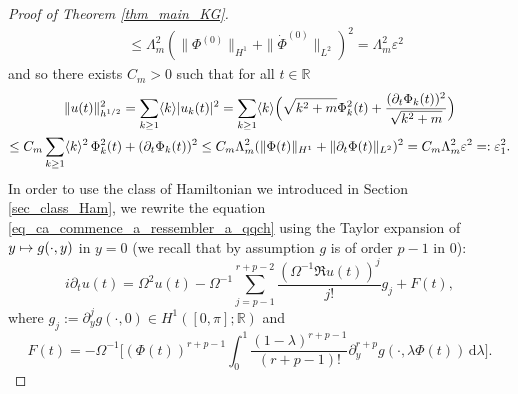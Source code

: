 \documentclass[11pt]{article}
\newcommand\mto{\mathchoice{\longmapsto}{\mapsto}{\mapsto}{\mapsto}}
\theoremstyle{definition}
\begin{document}
\begin{proof}[Proof of Theorem \ref{thm_main_KG}]
\begin{equation*}
\begin{split}
&\leq \Lambda_m^2 (\|\Phi^{(0)}\|_{H^1} +\|\dot{\Phi}^{(0)}\|_{ L^2})^2 = \Lambda_m^2 \varepsilon^2
\end{split}
\end{equation*}
and so there exists $C_m>0$ such that for all $t\in \mathbb{R}$
\begin{multline*}
\|u(t)\|_{h^{1/2}}^2 = \sum_{k\geq 1} \langle k \rangle |u_k(t)|^2 = \sum_{k\geq 1} \langle k \rangle \Bigl(\sqrt{k^2+m} \Phi_k^2(t) + \frac{(\partial_t \Phi_k(t))^2}{ \sqrt{k^2+m} } \Bigr) \\
\leq C_m \sum_{k\geq 1} \langle k \rangle^2 \, \Phi_k^2(t) + (\partial_t \Phi_k(t))^2 \leq C_m\Lambda_m^2 (\| \Phi(t) \|_{H^1} + \| \partial_t \Phi(t) \|_{L^2})^2= C_m\Lambda_m^2 \varepsilon^2 =:\varepsilon_1^2.
\end{multline*}
In order to use the class of Hamiltonian we introduced in Section \ref{sec_class_Ham},
we rewrite the equation \eqref{eq_ca_commence_a_ressembler_a_qqch} using the Taylor expansion of $y\mto g(\cdot,y)$ in $y=0$ (we recall that by assumption $g$ is of order $p-1$ in $0$):
\begin{equation}
\label{eq_ca_ressemble_presque_a_qqch}
i\partial_t u(t) = \Omega^2 u(t) - \Omega^{-1} \sum_{j=p-1}^{r+p-2} \frac{(\Omega^{-1} \Re u(t))^j}{j !} g_j + F(t),
\end{equation}
where $g_j:= \partial_{y}^{j} g(\cdot,0) \in H^1([0,\pi];\mathbb{R})$ and
\[
F(t) = -\Omega^{-1} \biggl[(\Phi(t))^{r+p-1} \int_0^1 \frac{(1-\lambda)^{r+p-1}}{(r+p-1)!} \partial_{y}^{r+p} g(\cdot,\lambda \Phi(t)) \, \mathrm{d}\lambda \biggr].
\]


\end{proof}
\end{document}
